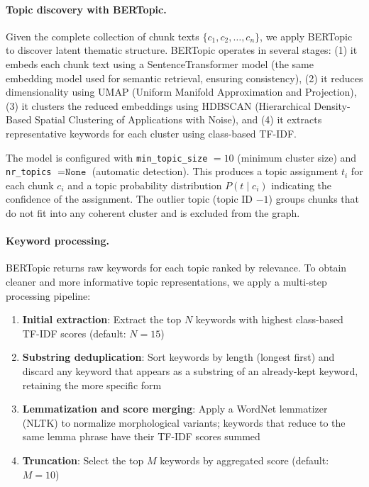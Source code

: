 \documentclass[10pt]{article}
\begin{document}
\paragraph{Topic discovery with BERTopic.} Given the complete collection of chunk texts $\{c_1, c_2, \ldots, c_n\}$, we apply BERTopic to discover latent thematic structure. BERTopic operates in several stages: (1) it embeds each chunk text using a SentenceTransformer model (the same embedding model used for semantic retrieval, ensuring consistency), (2) it reduces dimensionality using UMAP (Uniform Manifold Approximation and Projection), (3) it clusters the reduced embeddings using HDBSCAN (Hierarchical Density-Based Spatial Clustering of Applications with Noise), and (4) it extracts representative keywords for each cluster using class-based TF-IDF.

The model is configured with \texttt{min\_topic\_size} $= 10$ (minimum cluster size) and \texttt{nr\_topics} $= \texttt{None}$ (automatic detection). This produces a topic assignment $t_i$ for each chunk $c_i$ and a topic probability distribution $P(t \mid c_i)$ indicating the confidence of the assignment. The outlier topic (topic ID $-1$) groups chunks that do not fit into any coherent cluster and is excluded from the graph.

\paragraph{Keyword processing.} BERTopic returns raw keywords for each topic ranked by relevance. To obtain cleaner and more informative topic representations, we apply a multi-step processing pipeline:

\begin{enumerate}[itemsep=2pt]
    \item \textbf{Initial extraction}: Extract the top $N$ keywords with highest class-based TF-IDF scores (default: $N=15$)
    \item \textbf{Substring deduplication}: Sort keywords by length (longest first) and discard any keyword that appears as a substring of an already-kept keyword, retaining the more specific form
    \item \textbf{Lemmatization and score merging}: Apply a WordNet lemmatizer (NLTK) to normalize morphological variants; keywords that reduce to the same lemma phrase have their TF-IDF scores summed
    \item \textbf{Truncation}: Select the top $M$ keywords by aggregated score (default: $M=10$)
\end{enumerate}
\end{document}
